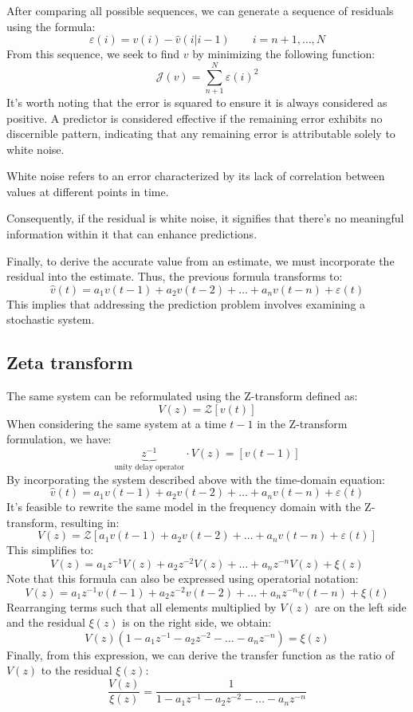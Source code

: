 After comparing all possible sequences, we can generate a sequence of residuals using the formula:
\[\varepsilon(i) = v(i) - \hat{v}(i | i - 1) \qquad i = n+1,\dots,N\]
From this sequence, we seek to find $v$  by minimizing the following function:
\[\mathcal{J}(v)=\sum_{n+1}^N\varepsilon(i)^2\]
It's worth noting that the error is squared to ensure it is always considered as positive.
A predictor is considered effective if the remaining error exhibits no discernible pattern, indicating that any remaining error is attributable solely to white noise.
\begin{definition}
    White noise refers to an error characterized by its lack of correlation between values at different points in time.
\end{definition}
Consequently, if the residual is white noise, it signifies that there's no meaningful information within it that can enhance predictions.

Finally, to derive the accurate value from an estimate, we must incorporate the residual into the estimate. 
Thus, the previous formula transforms to:
\[\hat{v}(t)=a_1v(t-1)+a_2v(t-2)+\dots+a_nv(t-n)+\varepsilon(t)\]
This implies that addressing the prediction problem involves examining a stochastic system.

\subsection{Zeta transform}
The same system can be reformulated using the Z-transform defined as:
\[V(z)=\mathcal{Z} \left[v(t)\right]\]
When considering the same system at a time $t-1$ in the Z-transform formulation, we have:
\[\underbrace{z^{-1}}_{\text{unity delay operator}} \cdot V(z) =\left[v(t-1)\right]\]
By incorporating the system described above with the time-domain equation:
\[\hat{v}(t)=a_1v(t-1)+a_2v(t-2)+\dots+a_nv(t-n)+\varepsilon(t)\]
It's feasible to rewrite the same model in the frequency domain with the Z-transform, resulting in:
\[V(z)=\mathcal{Z}\left[ a_1v(t-1)+a_2v(t-2)+\dots+a_nv(t-n)+\varepsilon(t) \right]\]
This simplifies to:
\[V(z)=a_1z^{-1}V(z)+a_2z^{-2}V(z)+\dots+a_nz^{-n}V(z)+\xi(z) \]
Note that this formula can also be expressed using operatorial notation:
\[V(z)=a_1z^{-1}v(t-1)+a_2z^{-2}v(t-2)+\dots+a_nz^{-n}v(t-n)+\xi(t) \]
Rearranging terms such that all elements multiplied by $V(z)$ are on the left side and the residual $\xi(z)$ is on the right side, we obtain:
\[V(z)\left(1 -a_1z^{-1}-a_2z^{-2}-\dots-a_nz^{-n}\right)=\xi(z) \]
Finally, from this expression, we can derive the transfer function as the ratio of $V(z)$ to the residual $\xi(z)$: 
\[\dfrac{V(z)}{\xi(z)}=\dfrac{1}{1 -a_1z^{-1}-a_2z^{-2}-\dots-a_nz^{-n}}\]

